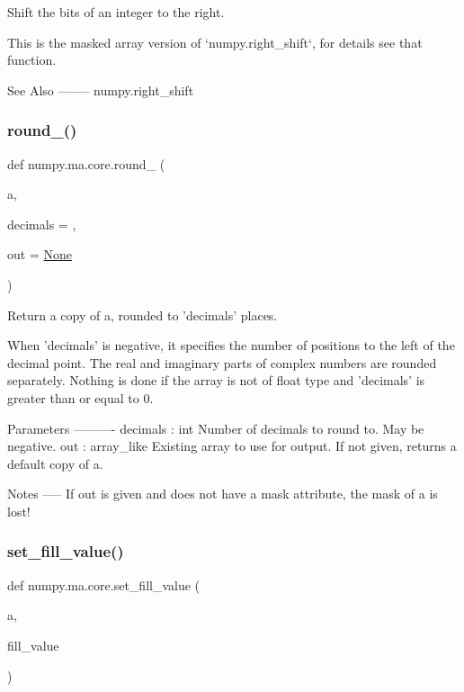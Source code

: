 \begin{DoxyVerb}Shift the bits of an integer to the right.

This is the masked array version of `numpy.right_shift`, for details
see that function.

See Also
--------
numpy.right_shift\end{DoxyVerb}
 \mbox{\label{namespacenumpy_1_1ma_1_1core_adee5639766b0b44d4844c6f171345eb6}} 
\subsubsection{\texorpdfstring{round\+\_\+()}{round\_()}}
{\footnotesize\ttfamily def numpy.\+ma.\+core.\+round\+\_\+ (\begin{DoxyParamCaption}\item[{}]{a,  }\item[{}]{decimals = {},  }\item[{}]{out = {\ttfamily \hyperlink{namespacenumpy_1_1ma_1_1core_a647ee1848dfa3692fe35a663a2aa40b3}{None}} }\end{DoxyParamCaption})}

\begin{DoxyVerb}Return a copy of a, rounded to 'decimals' places.

When 'decimals' is negative, it specifies the number of positions
to the left of the decimal point.  The real and imaginary parts of
complex numbers are rounded separately. Nothing is done if the
array is not of float type and 'decimals' is greater than or equal
to 0.

Parameters
----------
decimals : int
    Number of decimals to round to. May be negative.
out : array_like
    Existing array to use for output.
    If not given, returns a default copy of a.

Notes
-----
If out is given and does not have a mask attribute, the mask of a
is lost!\end{DoxyVerb}
 \mbox{\label{namespacenumpy_1_1ma_1_1core_aa7488cd2b6badc0bbdbdedbb7298b67c}} 
\subsubsection{\texorpdfstring{set\+\_\+fill\+\_\+value()}{set\_fill\_value()}}
{\footnotesize\ttfamily def numpy.\+ma.\+core.\+set\+\_\+fill\+\_\+value (\begin{DoxyParamCaption}\item[{}]{a,  }\item[{}]{fill\+\_\+value }\end{DoxyParamCaption})}

